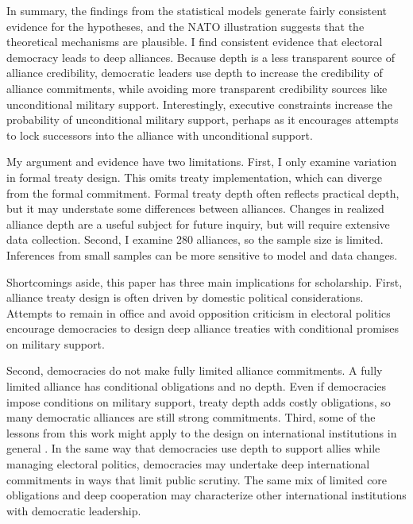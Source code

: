 \documentclass[12pt]{article}
\begin{document}
In summary, the findings from the statistical models generate fairly consistent evidence for the hypotheses, and the NATO illustration suggests that the theoretical mechanisms are plausible. 
I find consistent evidence that electoral democracy leads to deep alliances.  
Because depth is a less transparent source of alliance credibility, democratic leaders use depth to increase the credibility of alliance commitments, while avoiding more transparent credibility sources like unconditional military support.
Interestingly, executive constraints increase the probability of unconditional military support, perhaps as it encourages attempts to lock successors into the alliance with unconditional support. 


My argument and evidence have two limitations.
First, I only examine variation in formal treaty design. 
This omits treaty implementation, which can diverge from the formal commitment.   
Formal treaty depth often reflects practical depth, but it may understate some differences between alliances. 
Changes in realized alliance depth are a useful subject for future inquiry, but will require extensive data collection.
Second, I examine 280 alliances, so the sample size is limited. 
Inferences from small samples can be more sensitive to model and data changes. 


Shortcomings aside, this paper has three main implications for scholarship. 
First, alliance treaty design is often driven by domestic political considerations. 
Attempts to remain in office and avoid opposition criticism in electoral politics encourage democracies to design deep alliance treaties with conditional promises on military support. 


Second, democracies do not make fully limited alliance commitments. 
A fully limited alliance has conditional obligations and no depth.
Even if democracies impose conditions on military support, treaty depth adds costly obligations, so many democratic alliances are still strong commitments.  
Third, some of the lessons from this work might apply to the design on international institutions in general \citep{DownesRocke1995, MartinSimmons1998, Koremenosetal2001, Thompson2010}.
In the same way that democracies use depth to support allies while managing electoral politics, democracies may undertake deep international commitments in ways that limit public scrutiny. 
The same mix of limited core obligations and deep cooperation may characterize other international institutions with democratic leadership. 
\end{document}
